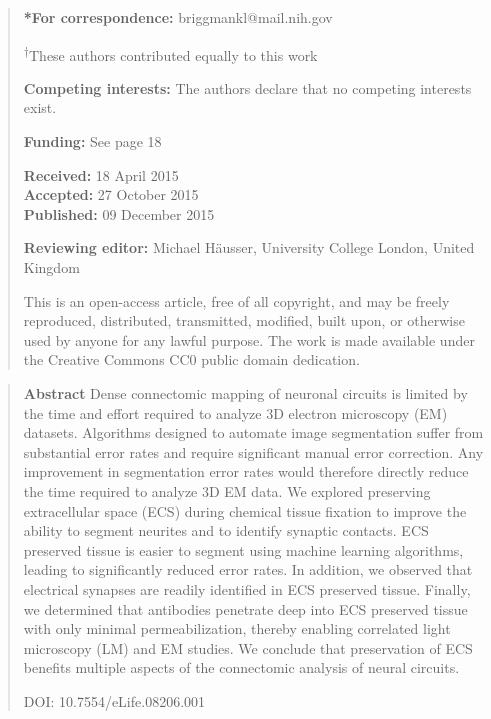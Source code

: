 \documentclass{article}
\begin{document}
\begin{quote}\small
\noindent \textbf{*For correspondence:} briggmankl@mail.nih.gov

\noindent \textsuperscript{†}These authors contributed equally to this work

\noindent \textbf{Competing interests:} The authors declare that no competing interests exist.

\noindent \textbf{Funding:} See page 18

\noindent \textbf{Received:} 18 April 2015\\
\textbf{Accepted:} 27 October 2015\\
\textbf{Published:} 09 December 2015

\noindent \textbf{Reviewing editor:} Michael Häusser, University College London, United Kingdom

\noindent This is an open-access article, free of all copyright, and may be freely reproduced, distributed, transmitted, modified, built upon, or otherwise used by anyone for any lawful purpose. The work is made available under the Creative Commons CC0 public domain dedication.
\end{quote}

\begin{quote}
\noindent\textbf{Abstract} Dense connectomic mapping of neuronal circuits is limited by the time and effort required to analyze 3D electron microscopy (EM) datasets. Algorithms designed to automate image segmentation suffer from substantial error rates and require significant manual error correction. Any improvement in segmentation error rates would therefore directly reduce the time required to analyze 3D EM data. We explored preserving extracellular space (ECS) during chemical tissue fixation to improve the ability to segment neurites and to identify synaptic contacts. ECS preserved tissue is easier to segment using machine learning algorithms, leading to significantly reduced error rates. In addition, we observed that electrical synapses are readily identified in ECS preserved tissue. Finally, we determined that antibodies penetrate deep into ECS preserved tissue with only minimal permeabilization, thereby enabling correlated light microscopy (LM) and EM studies. We conclude that preservation of ECS benefits multiple aspects of the connectomic analysis of neural circuits.

\noindent DOI: 10.7554/eLife.08206.001
\end{quote}
\end{document}
